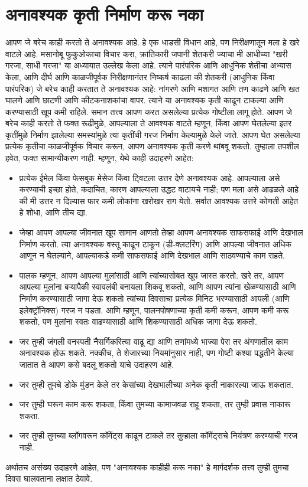 \chapter{अनावश्यक कृती निर्माण करू नका}
आपण जे बरेच काही करतो ते अनावश्यक आहे. हे एक धाडसी विधान आहे, पण निरीक्षणातून मला हे खरे वाटले आहे.
मसानोबू फुकुओकाचा विचार करा, क्रांतिकारी जपानी शेतकरी ज्याचा मी आधीच्या "खरी गरजा, साधी गरजा" या अध्यायात उल्लेख केला आहे. त्याने पारंपरिक आणि आधुनिक शेतीचा अभ्यास केला, आणि दीर्घ आणि काळजीपूर्वक निरीक्षणानंतर निष्कर्ष काढला की शेतकरी (आधुनिक किंवा पारंपरिक) जे बरेच काही करतात ते अनावश्यक आहे: नांगरणे आणि मशागत आणि तण काढणे आणि खत घालणे आणि छाटणी आणि कीटकनाशकांचा वापर. त्याने या अनावश्यक कृती काढून टाकल्या आणि करण्यासाठी खूप कमी राहिले.
समान तत्त्व आपण करत असलेल्या प्रत्येक गोष्टीला लागू होते. आपण जे बरेच काही करतो ते फक्त रूढीमुळे, आपल्याला ते आवश्यक वाटते म्हणून, किंवा आपण घेतलेल्या इतर कृतींमुळे निर्माण झालेल्या समस्यांमुळे त्या कृतींची गरज निर्माण केल्यामुळे केले जाते. आपण घेत असलेल्या प्रत्येक कृतीचा काळजीपूर्वक विचार करून, आपण अनावश्यक कृती करणे थांबवू शकतो.
तुम्हाला तपशील हवेत, फक्त सामान्यीकरण नाही. म्हणून, येथे काही उदाहरणे आहेत:
\begin{itemize}
\item प्रत्येक ईमेल किंवा फेसबुक मेसेज किंवा ट्विटला उत्तर देणे अनावश्यक आहे. आपल्याला असे करण्याची इच्छा होते, कदाचित, कारण आपल्याला उद्धट वाटायचे नाही; पण मला असे आढळले आहे की मी उत्तर न दिल्यास फार कमी लोकांना खरोखर राग येतो. सर्वात आवश्यक उत्तरे कोणती आहेत हे शोधा, आणि तीच द्या.
\item जेव्हा आपण आपल्या जीवनात खूप सामान आणतो तेव्हा आपण अनावश्यक साफसफाई आणि देखभाल निर्माण करतो. त्या अनावश्यक वस्तू काढून टाकून (डी-क्लटरिंग) आणि आपल्या जीवनात अधिक आणून न घेतल्याने, आपल्याकडे कमी साफसफाई आणि देखभाल आणि साठवण्याचे काम राहते.
\item पालक म्हणून, आपण आपल्या मुलांसाठी आणि त्यांच्यासोबत खूप जास्त करतो. खरे तर, आपण आपल्या मुलांना बऱ्यापैकी स्वावलंबी बनायला शिकवू शकतो, आणि आपण त्यांना खेळण्यासाठी आणि निर्माण करण्यासाठी जागा देऊ शकतो त्यांच्या दिवसाचा प्रत्येक मिनिट भरण्यासाठी आपली (आणि इलेक्ट्रॉनिक्स) गरज न पडता. आणि म्हणून, पालनपोषणाच्या कृती कमी करून, आपण कमी करू शकतो, पण मुलांना स्वतः वाढण्यासाठी आणि शिकण्यासाठी अधिक जागा देऊ शकतो.
\item जर तुम्ही जंगली वनस्पती नैसर्गिकरित्या वाढू द्या आणि तणांमध्ये भाज्या पेरा तर अंगणातील काम अनावश्यक होऊ शकते. नक्कीच, ते शेजारच्या नियमांनुसार नाही, पण गोष्टी कश्या पद्धतीने केल्या जातात ते आपण कसे बदलू शकतो याचे उदाहरण आहे.
\item जर तुम्ही तुमचे डोके मुंडन केले तर केसांच्या देखभालीच्या अनेक कृती नाकारल्या जाऊ शकतात.
\item जर तुम्ही घरून काम करू शकता, किंवा तुमच्या कामाजवळ राहू शकता, तर तुम्ही प्रवास नाकारू शकता.
\item जर तुम्ही तुमच्या ब्लॉगवरून कॉमेंट्स काढून टाकले तर तुम्हाला कॉमेंट्सचे नियंत्रण करण्याची गरज नाही.
\end{itemize}
अर्थातच असंख्य उदाहरणे आहेत, पण "अनावश्यक काहीही करू नका" हे मार्गदर्शक तत्त्व तुम्ही तुमचा दिवस घालवताना लक्षात ठेवावे.


